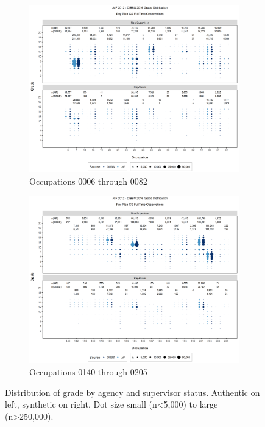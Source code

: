 \documentclass[10pt, letterpaper]{article}
\begin{document}
\begin{spacing}{1.0}
\clearpage

\begin{figure}[]
    \centering
    \begin{subfigure}{1\textwidth}
        \centering
        \includegraphics[width=6in, trim={0 0.55in 0 0.75in}, clip]{JdFDIBBSGSFullTimeGradeSupervisoryStatusOccupation1.png}
        \caption{Occupations 0006 through 0082}
        \vspace{10pt}
    \end{subfigure}
    \begin{subfigure}{1\textwidth}
        \centering
        \includegraphics[width=6in, trim={0 0.55in 0 0.75in}, clip]{JdFDIBBSGSFullTimeGradeSupervisoryStatusOccupation41.png}
        \caption{Occupations 0140 through 0205}
    \end{subfigure}
    \caption{Distribution of grade by agency and supervisor status.  Authentic on left, synthetic on right.  Dot size small (n<5,000) to large (n>250,000).}
    \label{figure:JdFDIBBSGSFullTimeGradeSupervisoryStatusOccupation}
\end{figure}


\end{spacing}
\end{document}

